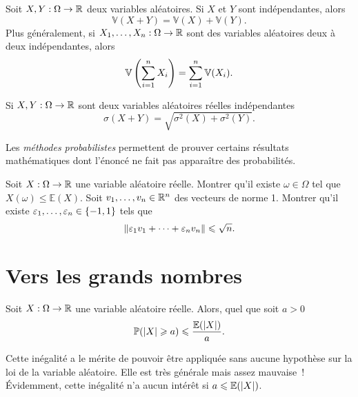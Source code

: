 \documentclass{magnolia}
\begin{document}
\begin{proposition}
Soit $X,Y:\Omega\to\mathbb{R}$ deux variables aléatoires. Si $X$ et $Y$ sont indépendantes, alors
\[\mathbb{V}(X+Y)=\mathbb{V}(X)+\mathbb{V}(Y).\]
Plus généralement, si $X_1,\ldots,X_n:\Omega\to\mathbb{R}$ sont des variables aléatoires deux à deux
indépendantes, alors
\[\mathbb{V}\left(\sum_{i=1}^n X_i\right)=\sum_{i=1}^n \mathbb{V}(X_i).\]
\end{proposition}

\begin{remarqueUnique}
\remarque Si $X,Y:\Omega\to\mathbb{R}$ sont deux variables aléatoires réelles indépendantes
  \[\sigma(X+Y)=\sqrt{\sigma^2(X)+\sigma^2(Y)}.\]
\end{remarqueUnique}

\begin{exoUnique}
\exo Les \emph{méthodes probabilistes} permettent de prouver certains résultats mathématiques
  dont l'énoncé ne fait pas apparaître des probabilités.
  \begin{questions}
  \question Soit $X:\Omega\to\mathbb{R}$ une variable aléatoire réelle. Montrer qu'il existe
    $\omega\in\Omega$ tel que $X(\omega)\leq\mathbb{E}(X)$.
  \question Soit $v_1,\ldots,v_n\in\mathbb{R}^n$ des vecteurs de norme 1. Montrer qu'il existe
    $\varepsilon_1,\ldots,\varepsilon_n\in\left\{-1,1\right\}$ tels que
    \[\left\|\varepsilon_1 v_1+\cdots+\varepsilon_n v_n\right\|\leqslant\sqrt{n}.\]
  \end{questions}
\end{exoUnique}

\section{Vers les grands nombres}

\begin{proposition}[nom={Inégalité de \nom{Markov}}]
Soit $X:\Omega\to\mathbb{R}$ une variable aléatoire réelle. Alors, quel que soit $a>0$
\[\mathbb{P}(\left|X\right|\geqslant a)\leqslant\frac{\mathbb{E}(\left|X\right|)}{a}.\]
\end{proposition}

\begin{remarqueUnique}
\remarque Cette inégalité a le mérite de pouvoir être appliquée sans aucune hypothèse sur la
  loi de la variable aléatoire. Elle est très générale mais assez mauvaise~! Évidemment, cette
  inégalité n'a aucun intérêt si $a\leqslant \mathbb{E}(\left|X\right|)$.
\end{remarqueUnique}
\end{document}
